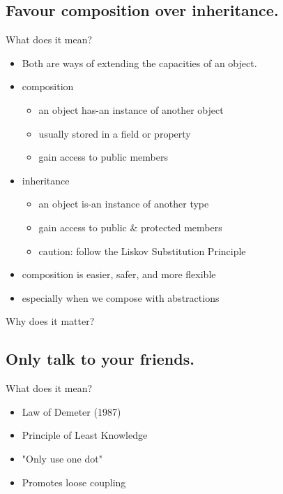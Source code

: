 \documentclass{beamer}
\begin{document}
\begin{frame}{}
    
\end{frame}

\subsection{Favour composition over inheritance.}

\begin{frame}{What does it mean?}
    \begin{itemize}
        \item Both are ways of extending the capacities of an object.    
        \item composition
            \begin{itemize}
                \item an object has-an instance of another object
                \item usually stored in a field or property
                \item gain access to public members
            \end{itemize}
        \item inheritance
            \begin{itemize}
                \item an object is-an instance of another type
                \item gain access to public & protected members
                \item caution: follow the Liskov Substitution Principle
            \end{itemize}
        \item composition is easier, safer, and more flexible
        \item especially when we compose with abstractions 
    \end{itemize}
\end{frame}

\begin{frame}{Why does it matter?}
\end{frame}

\subsection{Only talk to your friends.}


\begin{frame}{What does it mean?}
    \begin{itemize}
        \item Law of Demeter (1987)
        \item Principle of Least Knowledge
        \item "Only use one dot"
        \item Promotes loose coupling
    \end{itemize}
\end{frame}
\end{document}
